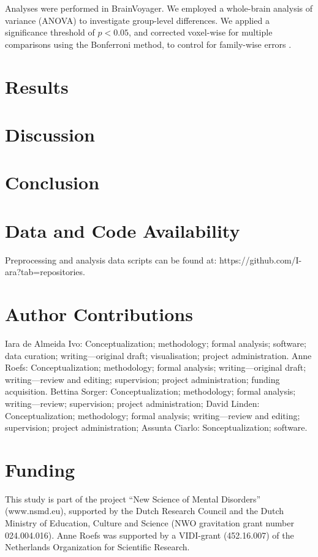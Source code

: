 \documentclass[]{imag-ms-template}
\begin{document}
Analyses were performed in BrainVoyager. We employed a whole-brain analysis of variance (ANOVA) to investigate group-level differences. We applied a significance threshold of $p < 0.05$, and corrected voxel-wise for multiple comparisons using the Bonferroni method, to control for family-wise errors .

\section{Results}

\section{Discussion}

\section{Conclusion}

\section*{Data and Code Availability}

Preprocessing and analysis data scripts can be found at: https://github.com/I-ara?tab=repositories.

\section*{Author Contributions}

Iara de Almeida Ivo: Conceptualization; methodology; formal analysis; software; data curation; writing—original draft; visualisation; project administration.
Anne Roefs: Conceptualization; methodology; formal analysis; writing—original draft; writing—review and editing; supervision; project administration; funding acquisition. 
Bettina Sorger: Conceptualization; methodology; formal analysis; writing—review; supervision; project administration;
David Linden: Conceptualization; methodology; formal analysis; writing—review and editing; supervision; project administration;
Assunta Ciarlo: Sonceptualization; software.

\section*{Funding}

This study is part of the project “New Science of Mental Disorders” (www.nsmd.eu), supported by the Dutch Research Council and the Dutch Ministry of Education, Culture and Science (NWO gravitation grant number 024.004.016). Anne Roefs was supported by a VIDI-grant (452.16.007) of the Netherlands Organization for Scientific Research.
\end{document}
